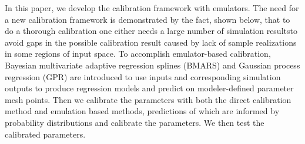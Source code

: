 \documentclass[review]{elsarticle}
\begin{document}
In this paper, we develop the calibration framework with emulators. The need for a new calibration framework is demonstrated by the fact, shown below, that to do a thorough calibration one either needs a large number of simulation results{to avoid gaps in the possible calibration result caused by lack of sample realizations in some regions of input space}. {To accomplish emulator-based calibration, Bayesian multivariate adaptive regression splines (BMARS) and Gaussian process regression (GPR) are introduced to use inputs and corresponding simulation outputs to produce regression models and predict on modeler-defined parameter mesh points.} Then we calibrate the parameters with both the {direct} calibration method and emulation based methods, predictions of which are informed by probability distributions and calibrate the parameters. We then test the calibrated parameters.
%
%
%
\end{document}
